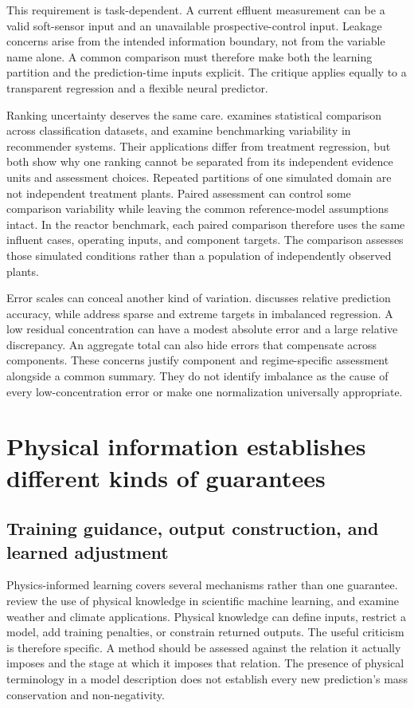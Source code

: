 This requirement is task-dependent. A current effluent measurement can be a valid soft-sensor input and an unavailable prospective-control input. Leakage concerns arise from the intended information boundary, not from the variable name alone. A common comparison must therefore make both the learning partition and the prediction-time inputs explicit. The critique applies equally to a transparent regression and a flexible neural predictor.

Ranking uncertainty deserves the same care. \citet{Demsar2006} examines statistical comparison across classification datasets, and \citet{Shevchenko2024} examine benchmarking variability in recommender systems. Their applications differ from treatment regression, but both show why one ranking cannot be separated from its independent evidence units and assessment choices. Repeated partitions of one simulated domain are not independent treatment plants. Paired assessment can control some comparison variability while leaving the common reference-model assumptions intact. In the reactor benchmark, each paired comparison therefore uses the same influent cases, operating inputs, and component targets. The comparison assesses those simulated conditions rather than a population of independently observed plants.

Error scales can conceal another kind of variation. \citet{Tofallis2015} discusses relative prediction accuracy, while \citet{Shahbazi2026} address sparse and extreme targets in imbalanced regression. A low residual concentration can have a modest absolute error and a large relative discrepancy. An aggregate total can also hide errors that compensate across components. These concerns justify component and regime-specific assessment alongside a common summary. They do not identify imbalance as the cause of every low-concentration error or make one normalization universally appropriate.

\section{Physical information establishes different kinds of guarantees}

\subsection{Training guidance, output construction, and learned adjustment}

Physics-informed learning covers several mechanisms rather than one guarantee. \citet{Karniadakis2021} review the use of physical knowledge in scientific machine learning, and \citet{Kashinath2021} examine weather and climate applications. Physical knowledge can define inputs, restrict a model, add training penalties, or constrain returned outputs. The useful criticism is therefore specific. A method should be assessed against the relation it actually imposes and the stage at which it imposes that relation. The presence of physical terminology in a model description does not establish every new prediction's mass conservation and non-negativity.

